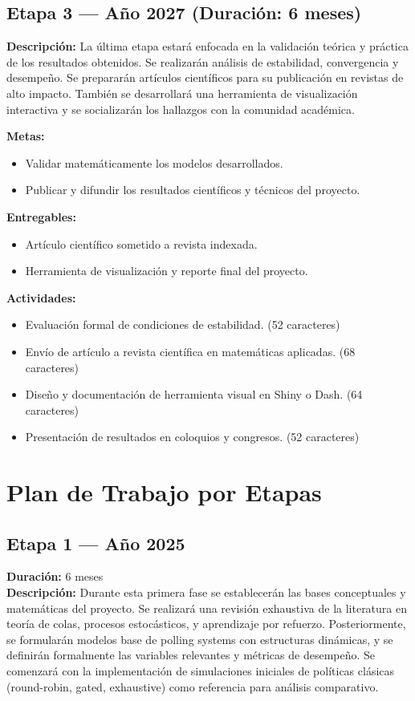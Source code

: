 \documentclass[12pt]{article}
\begin{document}
\subsection*{Etapa 3 — Año 2027 (Duración: 6 meses)}
\textbf{Descripción:} La última etapa estará enfocada en la validación teórica y práctica de los resultados obtenidos. Se realizarán análisis de estabilidad, convergencia y desempeño. Se prepararán artículos científicos para su publicación en revistas de alto impacto. También se desarrollará una herramienta de visualización interactiva y se socializarán los hallazgos con la comunidad académica.

\textbf{Metas:}
\begin{itemize}
  \item Validar matemáticamente los modelos desarrollados.
  \item Publicar y difundir los resultados científicos y técnicos del proyecto.
\end{itemize}

\textbf{Entregables:}
\begin{itemize}
  \item Artículo científico sometido a revista indexada.
  \item Herramienta de visualización y reporte final del proyecto.
\end{itemize}

\textbf{Actividades:}
\begin{itemize}
  \item Evaluación formal de condiciones de estabilidad. (52 caracteres)
  \item Envío de artículo a revista científica en matemáticas aplicadas. (68 caracteres)
  \item Diseño y documentación de herramienta visual en Shiny o Dash. (64 caracteres)
  \item Presentación de resultados en coloquios y congresos. (52 caracteres)
\end{itemize}
\section{Plan de Trabajo por Etapas}

\subsection*{Etapa 1 — Año 2025}
\textbf{Duración:} 6 meses\\
\textbf{Descripción:} Durante esta primera fase se establecerán las bases conceptuales y matemáticas del proyecto. Se realizará una revisión exhaustiva de la literatura en teoría de colas, procesos estocásticos, y aprendizaje por refuerzo. Posteriormente, se formularán modelos base de polling systems con estructuras dinámicas, y se definirán formalmente las variables relevantes y métricas de desempeño. Se comenzará con la implementación de simulaciones iniciales de políticas clásicas (round-robin, gated, exhaustive) como referencia para análisis comparativo.
\end{document}
